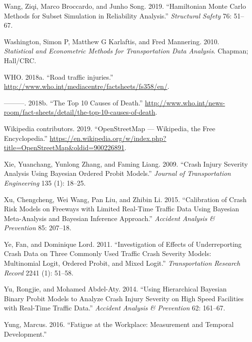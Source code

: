 \documentclass[12pt]{book}
\numberwithin{equation}{chapter}
\begin{document}
\leavevmode\hypertarget{ref-wang2019hamiltonian}{}%
Wang, Ziqi, Marco Broccardo, and Junho Song. 2019. ``Hamiltonian Monte Carlo Methods for Subset Simulation in Reliability Analysis.'' \emph{Structural Safety} 76: 51--67.

\leavevmode\hypertarget{ref-washington2010statistical}{}%
Washington, Simon P, Matthew G Karlaftis, and Fred Mannering. 2010. \emph{Statistical and Econometric Methods for Transportation Data Analysis}. Chapman; Hall/CRC.

\leavevmode\hypertarget{ref-who2018b}{}%
WHO. 2018a. ``Road traffic injuries.'' \url{http://www.who.int/mediacentre/factsheets/fs358/en/}.

\leavevmode\hypertarget{ref-who2018}{}%
---------. 2018b. ``The Top 10 Causes of Death.'' \url{http://www.who.int/news-room/fact-sheets/detail/the-top-10-causes-of-death}.

\leavevmode\hypertarget{ref-wikiOSM}{}%
Wikipedia contributors. 2019. ``OpenStreetMap --- Wikipedia, the Free Encyclopedia.'' \url{https://en.wikipedia.org/w/index.php?title=OpenStreetMap\&oldid=900226891}.

\leavevmode\hypertarget{ref-xie2009crash}{}%
Xie, Yuanchang, Yunlong Zhang, and Faming Liang. 2009. ``Crash Injury Severity Analysis Using Bayesian Ordered Probit Models.'' \emph{Journal of Transportation Engineering} 135 (1): 18--25.

\leavevmode\hypertarget{ref-xu2015calibration}{}%
Xu, Chengcheng, Wei Wang, Pan Liu, and Zhibin Li. 2015. ``Calibration of Crash Risk Models on Freeways with Limited Real-Time Traffic Data Using Bayesian Meta-Analysis and Bayesian Inference Approach.'' \emph{Accident Analysis \& Prevention} 85: 207--18.

\leavevmode\hypertarget{ref-ye2011investigation}{}%
Ye, Fan, and Dominique Lord. 2011. ``Investigation of Effects of Underreporting Crash Data on Three Commonly Used Traffic Crash Severity Models: Multinomial Logit, Ordered Probit, and Mixed Logit.'' \emph{Transportation Research Record} 2241 (1): 51--58.

\leavevmode\hypertarget{ref-yu2014using}{}%
Yu, Rongjie, and Mohamed Abdel-Aty. 2014. ``Using Hierarchical Bayesian Binary Probit Models to Analyze Crash Injury Severity on High Speed Facilities with Real-Time Traffic Data.'' \emph{Accident Analysis \& Prevention} 62: 161--67.

\leavevmode\hypertarget{ref-yung2016fatigue}{}%
Yung, Marcus. 2016. ``Fatigue at the Workplace: Measurement and Temporal Development.''
\end{document}
